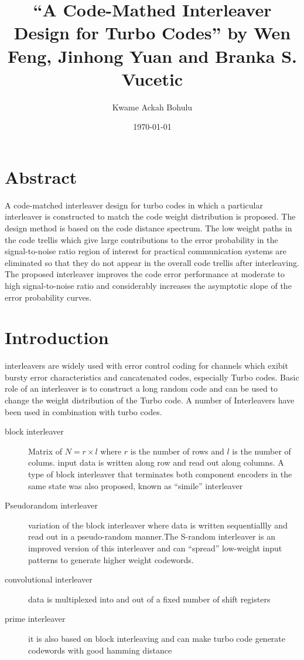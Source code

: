 \documentclass[11pt, oneside, dvipdfmx]{book}
\title{``A Code-Mathed Interleaver Design for Turbo Codes'' by Wen Feng, Jinhong Yuan and Branka S. Vucetic}
\author{Kwame Ackah Bohulu}
\date{\today}
\begin{document}
\maketitle

\section{Abstract}
A code-matched interleaver design for turbo codes
in which a particular interleaver is constructed to match the code
weight distribution is proposed. The design method is based on the
code distance spectrum. The low weight paths in the code trellis
which give large contributions to the error probability in the
signal-to-noise ratio region of interest for practical communication
systems are eliminated so that they do not appear in the overall
code trellis after interleaving. The proposed interleaver improves
the code error performance at moderate to high signal-to-noise
ratio and considerably increases the asymptotic slope of the error
probability curves.
\section{Introduction}
interleavers are widely used with error control coding for channels which exibit bursty error characteristics and cancatenated codes, especially Turbo codes.
Basic role of an interleaver is to construct a long random code and can be used to change the weight distribution of the Turbo code. A number of Interleavers have been used in combination with turbo codes.

\begin{description}
\item[block interleaver] Matrix of $N=r \times l$ where $r$ is the number of rows and $l$ is the number of colums. input data is written along row and read out along columns. A type of block interleaver that terminates both component encoders in the same state was also proposed, known as ``simile'' interleaver

\item[Pseudorandom interleaver] variation of the block interleaver where data is written sequentiallly and read out in a pseudo-random manner.The S-random interleaver is an improved version of this interleaver and can ``spread'' low-weight input patterns to generate higher weight codewords.

\item[convolutional interleaver] data is multiplexed into and out of a fixed number of shift registers

\item[prime interleaver] it is also based on block interleaving and can make turbo code generate codewords with good hamming distance
\end{description}
 
\end{document}
